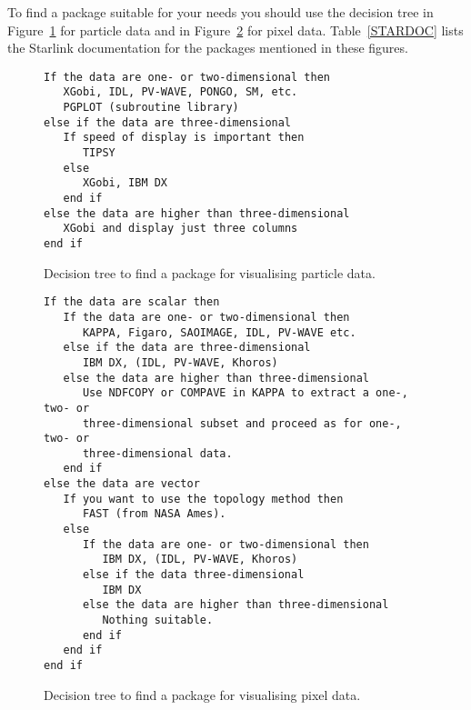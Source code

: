 \documentclass[twoside,11pt]{article}
\newenvironment{latexonly}{}{}
\begin{document}
To find a package suitable for your needs you should use the decision
tree in Figure~\ref{DECPART} for particle data and in
Figure~\ref{DECPIX} for pixel data.
\begin{latexonly}
Table~\ref{STARDOC} lists the Starlink documentation for the packages
mentioned in these figures.
\end{latexonly}

\begin{figure}[htbp]

\begin{verbatim}
If the data are one- or two-dimensional then
   XGobi, IDL, PV-WAVE, PONGO, SM, etc.
   PGPLOT (subroutine library)
else if the data are three-dimensional
   If speed of display is important then
      TIPSY
   else
      XGobi, IBM DX
   end if
else the data are higher than three-dimensional
   XGobi and display just three columns
end if
\end{verbatim}

\caption[Decision tree to find a package for visualising particle
data.]{Decision tree to find a package for visualising particle data.
\label{DECPART} }

\end{figure}


\begin{figure}[htbp]


\begin{verbatim}
If the data are scalar then
   If the data are one- or two-dimensional then
      KAPPA, Figaro, SAOIMAGE, IDL, PV-WAVE etc.
   else if the data are three-dimensional
      IBM DX, (IDL, PV-WAVE, Khoros)
   else the data are higher than three-dimensional
      Use NDFCOPY or COMPAVE in KAPPA to extract a one-, two- or
      three-dimensional subset and proceed as for one-, two- or
      three-dimensional data.
   end if
else the data are vector
   If you want to use the topology method then
      FAST (from NASA Ames).
   else
      If the data are one- or two-dimensional then
         IBM DX, (IDL, PV-WAVE, Khoros)
      else if the data three-dimensional
         IBM DX
      else the data are higher than three-dimensional
         Nothing suitable.
      end if
   end if
end if
\end{verbatim}

\caption[Decision tree to find a package for visualising pixel
data.]{Decision tree to find a package for visualising pixel data.
\label{DECPIX} }

\end{figure}
\end{document}
